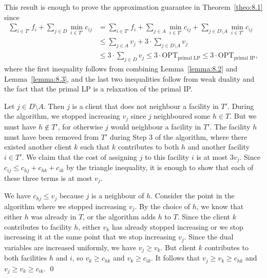 This result is enough to prove the approximation guarantee in 
Theorem~\ref{theo:8.1} since 
\begin{align*}
    \sum_{i\in T'} f_i + \sum_{j\in D} \min_{i\in T'} c_{ij} 
    &= \sum_{i\in T'} f_i + \sum_{j\in A} \min_{i\in T'} c_{ij} + 
    \sum_{j\in D \setminus A} \min_{i\in T'} c_{ij} \\ 
    &\leq \sum_{j\in A} v_j + 3 \cdot \sum_{j\in D \setminus A} v_j \\
    &\leq 3 \cdot \sum_{j\in D} v_j \leq 3 \cdot \text{OPT}_{\text{primal LP}} 
    \leq 3 \cdot \text{OPT}_{\text{primal IP}}, 
\end{align*}
where the first inequality follows from combining Lemma~\ref{lemma:8.2} and
Lemma~\ref{lemma:8.3}, and the last two inequalities follow 
from weak duality and the fact that the primal LP is a relaxation of the 
primal IP. 

\begin{pf}
    Let $j \in D \setminus A$. Then $j$ is a client that does not 
    neighbour a facility in $T'$. During the algorithm, we stopped increasing 
    $v_j$ since $j$ neighboured some $h \in T$. But we must have $h \notin T'$, 
    for otherwise $j$ would neighbour a facility in $T'$. The facility $h$ 
    must have been removed from $T'$ during Step 3 of the algorithm, where 
    there existed another client $k$ such that $k$ contributes to both 
    $h$ and another facility $i \in T'$. We claim that the 
    cost of assigning $j$ to this facility $i$ is at most $3v_j$. 
    Since $c_{ij} \leq c_{hj} + c_{hk} + c_{ik}$ by the triangle inequality, 
    it is enough to show that each of these three terms is at most $v_j$.

    We have $c_{hj} \leq v_j$ because $j$ is a neighbour of $h$. Consider the 
    point in the algorithm where we stopped increasing $v_j$. By the choice of 
    $h$, we know that either $h$ was already in $T$, or the algorithm adds 
    $h$ to $T$. Since the client $k$ contributes to facility $h$, either 
    $v_k$ has already stopped increasing or we stop increasing it at the 
    same point that we stop increasing $v_j$. Since the dual variables 
    are increased uniformly, we have $v_j \geq v_k$. But client $k$ 
    contributes to both facilities $h$ and $i$, so $v_k \geq c_{hk}$ 
    and $v_k \geq c_{ik}$. It follows that $v_j \geq v_k \geq c_{hk}$ and 
    $v_j \geq v_k \geq c_{ik}$. \qed 
\end{pf}